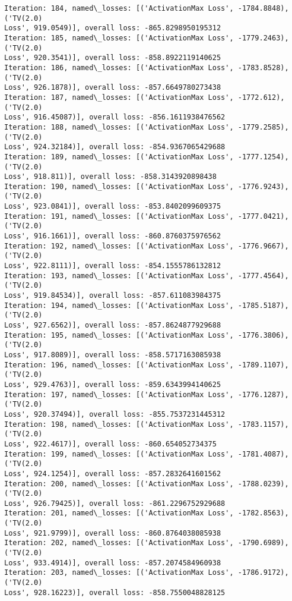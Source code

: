 \documentclass[10pt]{article}
\begin{document}
\begin{Verbatim}[commandchars=\\\{\}]
Iteration: 184, named\_losses: [('ActivationMax Loss', -1784.8848), ('TV(2.0)
Loss', 919.0549)], overall loss: -865.8298950195312
Iteration: 185, named\_losses: [('ActivationMax Loss', -1779.2463), ('TV(2.0)
Loss', 920.3541)], overall loss: -858.8922119140625
Iteration: 186, named\_losses: [('ActivationMax Loss', -1783.8528), ('TV(2.0)
Loss', 926.1878)], overall loss: -857.6649780273438
Iteration: 187, named\_losses: [('ActivationMax Loss', -1772.612), ('TV(2.0)
Loss', 916.45087)], overall loss: -856.1611938476562
Iteration: 188, named\_losses: [('ActivationMax Loss', -1779.2585), ('TV(2.0)
Loss', 924.32184)], overall loss: -854.9367065429688
Iteration: 189, named\_losses: [('ActivationMax Loss', -1777.1254), ('TV(2.0)
Loss', 918.811)], overall loss: -858.3143920898438
Iteration: 190, named\_losses: [('ActivationMax Loss', -1776.9243), ('TV(2.0)
Loss', 923.0841)], overall loss: -853.8402099609375
Iteration: 191, named\_losses: [('ActivationMax Loss', -1777.0421), ('TV(2.0)
Loss', 916.1661)], overall loss: -860.8760375976562
Iteration: 192, named\_losses: [('ActivationMax Loss', -1776.9667), ('TV(2.0)
Loss', 922.8111)], overall loss: -854.1555786132812
Iteration: 193, named\_losses: [('ActivationMax Loss', -1777.4564), ('TV(2.0)
Loss', 919.84534)], overall loss: -857.611083984375
Iteration: 194, named\_losses: [('ActivationMax Loss', -1785.5187), ('TV(2.0)
Loss', 927.6562)], overall loss: -857.8624877929688
Iteration: 195, named\_losses: [('ActivationMax Loss', -1776.3806), ('TV(2.0)
Loss', 917.8089)], overall loss: -858.5717163085938
Iteration: 196, named\_losses: [('ActivationMax Loss', -1789.1107), ('TV(2.0)
Loss', 929.4763)], overall loss: -859.6343994140625
Iteration: 197, named\_losses: [('ActivationMax Loss', -1776.1287), ('TV(2.0)
Loss', 920.37494)], overall loss: -855.7537231445312
Iteration: 198, named\_losses: [('ActivationMax Loss', -1783.1157), ('TV(2.0)
Loss', 922.4617)], overall loss: -860.654052734375
Iteration: 199, named\_losses: [('ActivationMax Loss', -1781.4087), ('TV(2.0)
Loss', 924.1254)], overall loss: -857.2832641601562
Iteration: 200, named\_losses: [('ActivationMax Loss', -1788.0239), ('TV(2.0)
Loss', 926.79425)], overall loss: -861.2296752929688
Iteration: 201, named\_losses: [('ActivationMax Loss', -1782.8563), ('TV(2.0)
Loss', 921.9799)], overall loss: -860.8764038085938
Iteration: 202, named\_losses: [('ActivationMax Loss', -1790.6989), ('TV(2.0)
Loss', 933.4914)], overall loss: -857.2074584960938
Iteration: 203, named\_losses: [('ActivationMax Loss', -1786.9172), ('TV(2.0)
Loss', 928.16223)], overall loss: -858.7550048828125

\end{Verbatim}
\end{document}
